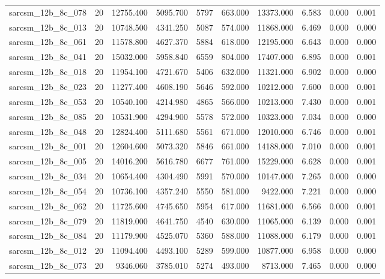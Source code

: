 \begin{tabular}{lrrrrrrrrr}
sarcsm\_12b\_8c\_078 & 20 & 12755.400 & 5095.700 & 5797 & 663.000 & 13373.000 & 6.583 & 0.000 & 0.001 \\
sarcsm\_12b\_8c\_013 & 20 & 10748.500 & 4341.250 & 5087 & 574.000 & 11868.000 & 6.469 & 0.000 & 0.000 \\
sarcsm\_12b\_8c\_061 & 20 & 11578.800 & 4627.370 & 5884 & 618.000 & 12195.000 & 6.643 & 0.000 & 0.000 \\
sarcsm\_12b\_8c\_041 & 20 & 15032.000 & 5958.840 & 6559 & 804.000 & 17407.000 & 6.895 & 0.000 & 0.001 \\
sarcsm\_12b\_8c\_018 & 20 & 11954.100 & 4721.670 & 5406 & 632.000 & 11321.000 & 6.902 & 0.000 & 0.000 \\
sarcsm\_12b\_8c\_023 & 20 & 11277.400 & 4608.190 & 5646 & 592.000 & 10212.000 & 7.600 & 0.000 & 0.001 \\
sarcsm\_12b\_8c\_053 & 20 & 10540.100 & 4214.980 & 4865 & 566.000 & 10213.000 & 7.430 & 0.000 & 0.001 \\
sarcsm\_12b\_8c\_085 & 20 & 10531.900 & 4294.900 & 5578 & 572.000 & 10323.000 & 7.034 & 0.000 & 0.000 \\
sarcsm\_12b\_8c\_048 & 20 & 12824.400 & 5111.680 & 5561 & 671.000 & 12010.000 & 6.746 & 0.000 & 0.001 \\
sarcsm\_12b\_8c\_001 & 20 & 12604.600 & 5073.320 & 5846 & 661.000 & 14188.000 & 7.010 & 0.000 & 0.001 \\
sarcsm\_12b\_8c\_005 & 20 & 14016.200 & 5616.780 & 6677 & 761.000 & 15229.000 & 6.628 & 0.000 & 0.001 \\
sarcsm\_12b\_8c\_034 & 20 & 10654.400 & 4304.490 & 5991 & 570.000 & 10147.000 & 7.265 & 0.000 & 0.000 \\
sarcsm\_12b\_8c\_054 & 20 & 10736.100 & 4357.240 & 5550 & 581.000 & 9422.000 & 7.221 & 0.000 & 0.000 \\
sarcsm\_12b\_8c\_062 & 20 & 11725.600 & 4745.650 & 5954 & 617.000 & 11681.000 & 6.566 & 0.000 & 0.001 \\
sarcsm\_12b\_8c\_079 & 20 & 11819.000 & 4641.750 & 4540 & 630.000 & 11065.000 & 6.139 & 0.000 & 0.001 \\
sarcsm\_12b\_8c\_084 & 20 & 11179.900 & 4525.070 & 5360 & 588.000 & 11088.000 & 6.179 & 0.000 & 0.001 \\
sarcsm\_12b\_8c\_012 & 20 & 11094.400 & 4493.100 & 5289 & 599.000 & 10877.000 & 6.958 & 0.000 & 0.000 \\
sarcsm\_12b\_8c\_073 & 20 & 9346.060 & 3785.010 & 5274 & 493.000 & 8713.000 & 7.465 & 0.000 & 0.000 \\

\end{tabular}
